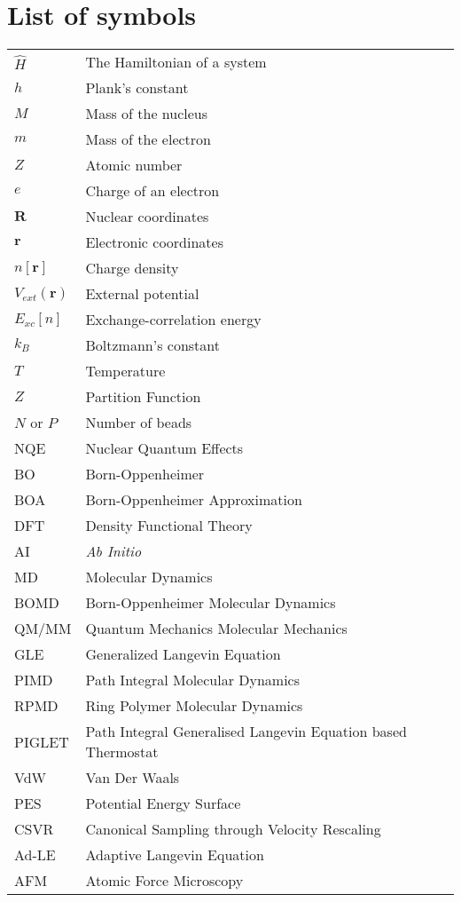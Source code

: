 \chapter{List of symbols}\label{symbols}


\begin{table}[h]
 \begin{tabular}{l l}
 $\hat{H}$               & The Hamiltonian of a system \\
 $h$                     & Plank's constant \\
 $M$                     & Mass of the nucleus \\ 
 $m$                     & Mass of the electron \\ 
 $Z$                     & Atomic number \\
 $e$                     & Charge of an electron \\
 $\textbf{R}$            & Nuclear coordinates \\
 $\textbf{r}$            & Electronic coordinates \\
  $n[\textbf{r}]$        & Charge density \\
 $V_{ext}(\textbf{r})$   & External potential \\
 $E_{{xc}}[n]$           & Exchange-correlation energy \\
 $k_B$                   & Boltzmann's constant \\
 $T$                     & Temperature \\
 $Z$                     & Partition Function \\
 $N$ or $P$                     & Number of beads\\
NQE & Nuclear Quantum Effects \\
BO & Born-Oppenheimer\\
BOA & Born-Oppenheimer Approximation \\
DFT & Density Functional Theory \\
AI & \textit{Ab Initio}\\
MD & Molecular Dynamics\\
BOMD & Born-Oppenheimer Molecular Dynamics\\
QM/MM & Quantum Mechanics Molecular Mechanics \\
GLE & Generalized Langevin Equation \\
PIMD & Path Integral Molecular Dynamics \\
RPMD & Ring Polymer Molecular Dynamics \\
PIGLET & Path Integral Generalised Langevin Equation based Thermostat \\
VdW & Van Der Waals \\
PES & Potential Energy Surface \\
CSVR & Canonical Sampling through Velocity Rescaling \\
Ad-LE & Adaptive Langevin Equation \\
AFM & Atomic Force Microscopy \\
 \end{tabular}
\end{table}


